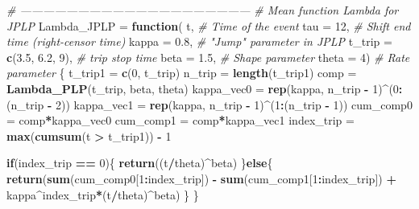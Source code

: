 \documentclass[
]{article}
\newenvironment{Shaded}{\begin{snugshade}}{\end{snugshade}}
\newcommand{\CommentTok}[1]{\textcolor[rgb]{0.56,0.35,0.01}{\textit{#1}}}
\newcommand{\ControlFlowTok}[1]{\textcolor[rgb]{0.13,0.29,0.53}{\textbf{#1}}}
\newcommand{\DataTypeTok}[1]{\textcolor[rgb]{0.13,0.29,0.53}{#1}}
\newcommand{\DecValTok}[1]{\textcolor[rgb]{0.00,0.00,0.81}{#1}}
\newcommand{\FloatTok}[1]{\textcolor[rgb]{0.00,0.00,0.81}{#1}}
\newcommand{\KeywordTok}[1]{\textcolor[rgb]{0.13,0.29,0.53}{\textbf{#1}}}
\newcommand{\NormalTok}[1]{#1}
\newcommand{\OperatorTok}[1]{\textcolor[rgb]{0.81,0.36,0.00}{\textbf{#1}}}
\newcommand{\StringTok}[1]{\textcolor[rgb]{0.31,0.60,0.02}{#1}}
\begin{document}
\begin{Shaded}
\begin{Highlighting}[]
\CommentTok{# ------------------------------------------------------------}
\CommentTok{# Mean function Lambda for JPLP}
\NormalTok{Lambda_JPLP =}\StringTok{ }\ControlFlowTok{function}\NormalTok{(}
\NormalTok{  t,                        }\CommentTok{# Time of the event}
  \DataTypeTok{tau =} \DecValTok{12}\NormalTok{,                 }\CommentTok{# Shift end time (right-censor time)}
  \DataTypeTok{kappa =} \FloatTok{0.8}\NormalTok{,              }\CommentTok{# "Jump" parameter in JPLP}
  \DataTypeTok{t_trip =} \KeywordTok{c}\NormalTok{(}\FloatTok{3.5}\NormalTok{, }\FloatTok{6.2}\NormalTok{, }\DecValTok{9}\NormalTok{),  }\CommentTok{# trip stop time}
  \DataTypeTok{beta =} \FloatTok{1.5}\NormalTok{,               }\CommentTok{# Shape parameter}
  \DataTypeTok{theta =} \DecValTok{4}\NormalTok{)                }\CommentTok{# Rate parameter}
\NormalTok{\{}
\NormalTok{  t_trip1 =}\StringTok{ }\KeywordTok{c}\NormalTok{(}\DecValTok{0}\NormalTok{, t_trip)}
\NormalTok{  n_trip =}\StringTok{ }\KeywordTok{length}\NormalTok{(t_trip1)}
\NormalTok{  comp =}\StringTok{ }\KeywordTok{Lambda_PLP}\NormalTok{(t_trip, beta, theta)}
\NormalTok{  kappa_vec0 =}\StringTok{ }\KeywordTok{rep}\NormalTok{(kappa, n_trip }\OperatorTok{-}\StringTok{ }\DecValTok{1}\NormalTok{)}\OperatorTok{^}\NormalTok{(}\DecValTok{0}\OperatorTok{:}\NormalTok{(n_trip }\OperatorTok{-}\StringTok{ }\DecValTok{2}\NormalTok{))}
\NormalTok{  kappa_vec1 =}\StringTok{ }\KeywordTok{rep}\NormalTok{(kappa, n_trip }\OperatorTok{-}\StringTok{ }\DecValTok{1}\NormalTok{)}\OperatorTok{^}\NormalTok{(}\DecValTok{1}\OperatorTok{:}\NormalTok{(n_trip }\OperatorTok{-}\StringTok{ }\DecValTok{1}\NormalTok{))}
\NormalTok{  cum_comp0 =}\StringTok{ }\NormalTok{comp}\OperatorTok{*}\NormalTok{kappa_vec0}
\NormalTok{  cum_comp1 =}\StringTok{ }\NormalTok{comp}\OperatorTok{*}\NormalTok{kappa_vec1}
\NormalTok{  index_trip =}\StringTok{ }\KeywordTok{max}\NormalTok{(}\KeywordTok{cumsum}\NormalTok{(t }\OperatorTok{>}\StringTok{ }\NormalTok{t_trip1)) }\OperatorTok{-}\StringTok{ }\DecValTok{1}

  \ControlFlowTok{if}\NormalTok{(index_trip }\OperatorTok{==}\StringTok{ }\DecValTok{0}\NormalTok{)\{}
    \KeywordTok{return}\NormalTok{((t}\OperatorTok{/}\NormalTok{theta)}\OperatorTok{^}\NormalTok{beta)}
\NormalTok{  \}}\ControlFlowTok{else}\NormalTok{\{}
    \KeywordTok{return}\NormalTok{(}\KeywordTok{sum}\NormalTok{(cum_comp0[}\DecValTok{1}\OperatorTok{:}\NormalTok{index_trip]) }\OperatorTok{-}\StringTok{ }\KeywordTok{sum}\NormalTok{(cum_comp1[}\DecValTok{1}\OperatorTok{:}\NormalTok{index_trip]) }\OperatorTok{+}
\StringTok{             }\NormalTok{kappa}\OperatorTok{^}\NormalTok{index_trip}\OperatorTok{*}\NormalTok{(t}\OperatorTok{/}\NormalTok{theta)}\OperatorTok{^}\NormalTok{beta)}
\NormalTok{  \}}
\NormalTok{\}}


\end{Highlighting}
\end{Shaded}
\end{document}
